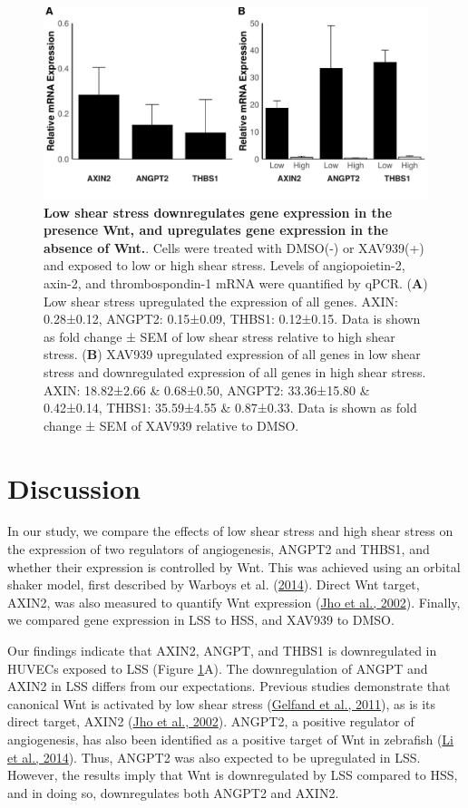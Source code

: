 \documentclass[
  11pt,
]{article}
\begin{document}
\begin{figure}
\centering
\includegraphics{report_files/figure-latex/plots-1.pdf}
\caption{\label{fig:plots}\textbf{Low shear stress downregulates gene expression in the presence Wnt, and upregulates gene expression in the absence of Wnt.}. Cells were treated with DMSO(-) or XAV939(+) and exposed to low or high shear stress. Levels of angiopoietin-2, axin-2, and thrombospondin-1 mRNA were quantified by qPCR. (\textbf{A}) Low shear stress upregulated the expression of all genes. AXIN: 0.28±0.12, ANGPT2: 0.15±0.09, THBS1: 0.12±0.15. Data is shown as fold change ± SEM of low shear stress relative to high shear stress. (\textbf{B}) XAV939 upregulated expression of all genes in low shear stress and downregulated expression of all genes in high shear stress. AXIN: 18.82±2.66 \& 0.68±0.50, ANGPT2: 33.36±15.80 \& 0.42±0.14, THBS1: 35.59±4.55 \& 0.87±0.33. Data is shown as fold change ± SEM of XAV939 relative to DMSO.}
\end{figure}

\hypertarget{discussion}{%
\section{Discussion}\label{discussion}}

In our study, we compare the effects of low shear stress and high shear stress on the expression of two regulators of angiogenesis, ANGPT2 and THBS1, and whether their expression is controlled by Wnt. This was achieved using an orbital shaker model, first described by Warboys et al. (\protect\hyperlink{ref-Warboys2014}{2014}). Direct Wnt target, AXIN2, was also measured to quantify Wnt expression (\protect\hyperlink{ref-Jho2002}{Jho et al., 2002}).
Finally, we compared gene expression in LSS to HSS, and XAV939 to DMSO.

Our findings indicate that AXIN2, ANGPT, and THBS1 is downregulated in HUVECs exposed to LSS (Figure \ref{fig:plots}A).
The downregulation of ANGPT and AXIN2 in LSS differs from our expectations.
Previous studies demonstrate that canonical Wnt is activated by low shear stress (\protect\hyperlink{ref-Gelfand2011}{Gelfand et al., 2011}), as is its direct target, AXIN2 (\protect\hyperlink{ref-Jho2002}{Jho et al., 2002}).
ANGPT2, a positive regulator of angiogenesis, has also been identified as a positive target of Wnt in zebrafish (\protect\hyperlink{ref-Li2014-mx}{Li et al., 2014}).
Thus, ANGPT2 was also expected to be upregulated in LSS.
However, the results imply that Wnt is downregulated by LSS compared to HSS, and in doing so, downregulates both ANGPT2 and AXIN2.
\end{document}
